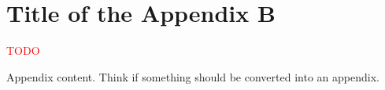 \chapter{Title of the Appendix B}
\label{Appendix:Key2}

\textcolor{red}{TODO}

Appendix content. Think if something should be converted into an appendix.
